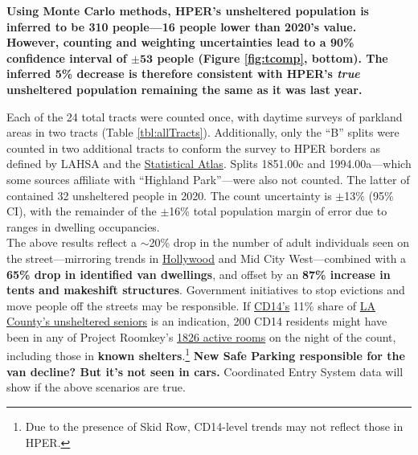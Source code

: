 \documentclass[11pt]{article}
\def\bfr{\bf\color{red}}
\begin{document}
\textbf{Using Monte Carlo methods, HPER's unsheltered population is inferred to be 
310 people---16 people lower than 2020's value. However, counting and weighting uncertainties lead
to a 90\% confidence interval of $\mathbf{\pm53}$ people (Figure \ref{fig:tcomp}, bottom). The 
inferred 5\% decrease is therefore consistent with HPER's \emph{true} unsheltered population 
remaining the same as it was last year.}


Each of the 24 total tracts were counted once, with daytime surveys of parkland areas in two tracts
(Table \ref{tbl:allTracts}). Additionally, only the ``B'' splits were counted in two additional tracts to 
conform the survey to HPER borders as defined by LAHSA and the \href{https://statisticalatlas.com/neighborhood/California/Los-Angeles/Eagle-Rock/Overview}{Statistical Atlas}. Splits 1851.00c and 
1994.00a---which some sources affiliate with ``Highland Park''---were also not counted. The latter
of contained 32 unsheltered people in 2020. The count uncertainty is $\pm$13\% (95\% CI), 
with the remainder of the $\pm$16\% total population margin of error due to ranges in 
dwelling occupancies.\\

 The above results reflect a $\sim$20\% drop in the number
of adult individuals seen on the street---mirroring trends in 
\href{https://www.latimes.com/homeless-housing/story/2021-04-13/despite-appearances-15-fewer-homeless-people-were-on-hollywood-streets-this-year}{Hollywood} and Mid City West---combined with a {\bf 65\% 
drop in identified van dwellings}, and offset by an {\bf 87\% increase in tents and makeshift structures}. 
Government initiatives to stop evictions and move people off the streets may be responsible. 
If \href{https://www.lahsa.org/documents?id=4673-2020-homeless-count-council-district-14}{CD14's} 11\% share of \href{https://www.lahsa.org/documents?id=4585-2020-greater-los-angeles-homeless-count-los-angeles-continuum-of-care-coc-}{LA County's unsheltered seniors} 
is an indication, 200 CD14 residents might have been in any of Project Roomkey's 
\href{https://projectroomkeytracker.com/}{1826 active rooms} on the night of the count, including 
those in {\bfr known shelters}.\footnote{Due to the presence of Skid Row, CD14-level trends may not
reflect those in HPER.} {\bfr New Safe Parking responsible for the van decline? But it's not seen in cars.}
Coordinated Entry System data will show if the above scenarios are true.
\end{document}
